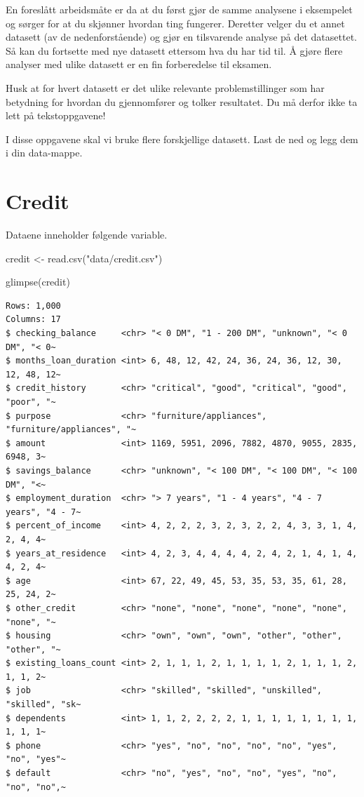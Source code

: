 \documentclass[
  letterpaper,
  DIV=11,
  numbers=noendperiod]{scrreprt}
\newenvironment{Shaded}{\begin{snugshade}}{\end{snugshade}}
\newcommand{\FunctionTok}[1]{\textcolor[rgb]{0.28,0.35,0.67}{#1}}
\newcommand{\NormalTok}[1]{\textcolor[rgb]{0.00,0.23,0.31}{#1}}
\newcommand{\OtherTok}[1]{\textcolor[rgb]{0.00,0.23,0.31}{#1}}
\newcommand{\StringTok}[1]{\textcolor[rgb]{0.13,0.47,0.30}{#1}}
\theoremstyle{definition}
\theoremstyle{remark}
\begin{document}
En foreslått arbeidsmåte er da at du først gjør de samme analysene i
eksempelet og sørger for at du skjønner hvordan ting fungerer. Deretter
velger du et annet datasett (av de nedenforstående) og gjør en
tilsvarende analyse på det datasettet. Så kan du fortsette med nye
datasett ettersom hva du har tid til. Å gjøre flere analyser med ulike
datasett er en fin forberedelse til eksamen.

Husk at for hvert datasett er det ulike relevante problemstillinger som
har betydning for hvordan du gjennomfører og tolker resultatet. Du må
derfor ikke ta lett på tekstoppgavene!

I disse oppgavene skal vi bruke flere forskjellige datasett. Last de ned
og legg dem i din data-mappe.

\hypertarget{credit}{%
\section{Credit}\label{credit}}

Dataene inneholder følgende variable.

\begin{Shaded}
\begin{Highlighting}[]
\NormalTok{credit }\OtherTok{\textless{}{-}} \FunctionTok{read.csv}\NormalTok{(}\StringTok{"data/credit.csv"}\NormalTok{)}

\FunctionTok{glimpse}\NormalTok{(credit)}
\end{Highlighting}
\end{Shaded}

\begin{verbatim}
Rows: 1,000
Columns: 17
$ checking_balance     <chr> "< 0 DM", "1 - 200 DM", "unknown", "< 0 DM", "< 0~
$ months_loan_duration <int> 6, 48, 12, 42, 24, 36, 24, 36, 12, 30, 12, 48, 12~
$ credit_history       <chr> "critical", "good", "critical", "good", "poor", "~
$ purpose              <chr> "furniture/appliances", "furniture/appliances", "~
$ amount               <int> 1169, 5951, 2096, 7882, 4870, 9055, 2835, 6948, 3~
$ savings_balance      <chr> "unknown", "< 100 DM", "< 100 DM", "< 100 DM", "<~
$ employment_duration  <chr> "> 7 years", "1 - 4 years", "4 - 7 years", "4 - 7~
$ percent_of_income    <int> 4, 2, 2, 2, 3, 2, 3, 2, 2, 4, 3, 3, 1, 4, 2, 4, 4~
$ years_at_residence   <int> 4, 2, 3, 4, 4, 4, 4, 2, 4, 2, 1, 4, 1, 4, 4, 2, 4~
$ age                  <int> 67, 22, 49, 45, 53, 35, 53, 35, 61, 28, 25, 24, 2~
$ other_credit         <chr> "none", "none", "none", "none", "none", "none", "~
$ housing              <chr> "own", "own", "own", "other", "other", "other", "~
$ existing_loans_count <int> 2, 1, 1, 1, 2, 1, 1, 1, 1, 2, 1, 1, 1, 2, 1, 1, 2~
$ job                  <chr> "skilled", "skilled", "unskilled", "skilled", "sk~
$ dependents           <int> 1, 1, 2, 2, 2, 2, 1, 1, 1, 1, 1, 1, 1, 1, 1, 1, 1~
$ phone                <chr> "yes", "no", "no", "no", "no", "yes", "no", "yes"~
$ default              <chr> "no", "yes", "no", "no", "yes", "no", "no", "no",~
\end{verbatim}
\end{document}
